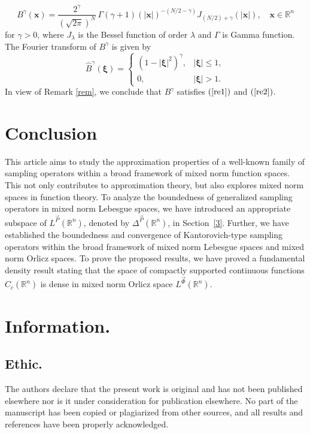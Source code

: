 \documentclass[11pt, a4paper]{article}
\theoremstyle{definition}
\numberwithin{equation}{section}
\def\ZZ{\mathbb Z}
\def\RR{\mathbb R}
\begin{document}
\[
 B^{\gamma}(\textbf{x}) = \frac{2^{\gamma}}{\left(\sqrt{2\pi}\right)^{N}}  \hspace{2pt}\Gamma(\gamma + 1)\left(|\textbf{x}|\right)^{-(N/2 - \gamma)} J_{\left(N/2 \right) + \gamma}(|\textbf{x}|), \quad  \textbf{x}\in \RR^n
\]
for $\gamma > 0$, where $J_{\lambda}$ is the Bessel function of order $\lambda$ and $\Gamma$ is Gamma function. The Fourier transform of $ B^{\gamma}$ is given by
\[
\widehat{B}^{\gamma}(\boldsymbol{\xi}) =  
\begin{cases} 
(1 - |\boldsymbol{\xi}|^2)^{\gamma}, & |\boldsymbol{\xi}| \leq 1, \\
0, & |\boldsymbol{\xi}| > 1.
\end{cases}
\]
In view of Remark \ref{rem}, we conclude that $B^{\gamma}$ satisfies $(\ref{re1})$ and $(\ref{re2})$.




\section{Conclusion}

This article aims to study the approximation properties of a well-known family of sampling operators within a broad framework of mixed norm function spaces. This not only contributes to approximation theory, but also explores mixed norm spaces in function theory. To analyze the boundedness of generalized sampling operators in mixed norm Lebesgue spaces, we have introduced an appropriate subspace of \( L^{\overrightarrow{P}}(\mathbb{R}^n) \), denoted by \( \Delta^{\overrightarrow{P}}(\mathbb{R}^n) \), in Section~\ref{3}. 
Further, we have established the boundedness and convergence of Kantorovich-type sampling operators within the broad framework of mixed norm Lebesgue spaces and mixed norm Orlicz spaces. To prove the proposed results, we have proved a fundamental density result stating that the space of compactly supported continuous functions $C_c(\RR^n)$ is dense in mixed norm Orlicz space $ L^{\overrightarrow{\Phi}}(\mathbb{R}^n).$ 

\section{Information.} 

\subsection{Ethic.}
\noindent 
The authors declare that the present work is original and has not been published elsewhere nor is it under consideration for publication elsewhere. No part of the manuscript has been copied or plagiarized from other sources, and all results and references have been properly acknowledged.
\end{document}
